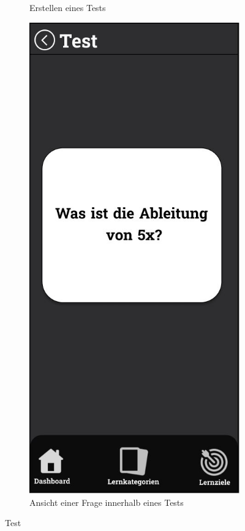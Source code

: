 \begin{figure}[htbp]
\begin{subfigure}[b]{0.45\linewidth}
          \caption{Erstellen eines Tests}
          \label{fig:test-erstellen}
        \end{subfigure}
        \hfill
        \begin{subfigure}[b]{0.45\linewidth}
          \centering
          \includegraphics[width=\linewidth]{images/Mockups/TestFrage.JPG}
          \caption{Ansicht einer Frage innerhalb eines Tests}
          \label{fig:test-frage}
        \end{subfigure}
        \caption{Test}
      \end{figure}


